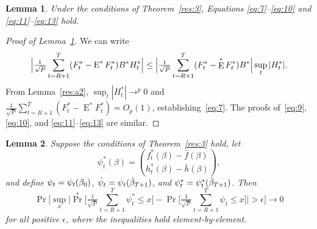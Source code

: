 \documentclass[11pt,fleqn]{article}
\newtheorem{lema}{Lemma}[section]
\theoremstyle{definition}
\DeclareMathOperator{\E}{E}
\DeclareMathOperator{\pr}{Pr}
\newcommand{\btrue}[1][]{\if#1*\hat\beta_{T+1}\else\beta_0\fi}
\newcommand{\osum}[1]{\sum_{#1=R+1}^T}
\newcommand{\oclt}[1]{\tfrac{1}{\sqrt{P}} \osum{#1}}
\begin{document}
\begin{lema}\label{res:a4}
  Under the conditions of Theorem~\ref{res:3}, Equations
  \eqref{eq:7}--\eqref{eq:10} and \eqref{eq:11}--\eqref{eq:13} hold.
\end{lema}

\begin{proof}[Proof of Lemma~\ref{res:a4}]
We can write
\begin{equation*}
  \Big\lvert \WesA[*] \Big\rvert \leq 
  \Big\lvert \oclt{t} (F_t^* - \E^* F^*_t) B^* \Big\rvert
  \sup_t | H_t^* |.
\end{equation*}
From Lemma~\ref{res:a2}, $\sup_t | H_t^* | \to^p 0$ and $\oclt{t}
(F_t^* - \E^* F_t^*) = O_p(1)$, establishing~\eqref{eq:7}.  The proofs
of~\eqref{eq:9}, \eqref{eq:10}, and \eqref{eq:11}--\eqref{eq:13} are
similar.
\end{proof}

\begin{lema}\label{res:a3}
  Suppose the conditions of Theorem~\ref{res:3} hold, let
  \[\psi_t^{*}(\beta) = 
  \binom{f_t^{*}(\beta) - \bar{f}(\beta)}{h_t^{*}(\beta) - \bar h(\beta)},\]
  and define $\psi_t = \psi_t(\btrue)$, $\hat\psi_t = \psi_t(\btrue[*])$, and 
  $\psi_t^* = \psi_t^*(\btrue[*])$.  Then
  \begin{equation}\label{eq:1}
    \pr\Big[\sup_x \Big| \pr^{*}\Big[ \oclt{t} \psi_{t}^{*}
    \leq x \Big] - \pr\Big[ \oclt{t} \psi_{t}
    \leq x \Big] \Big| > \epsilon \Big] \to 0
  \end{equation}
  for all positive $\epsilon$, where the inequalities hold element-by-element.
\end{lema}
\end{document}
